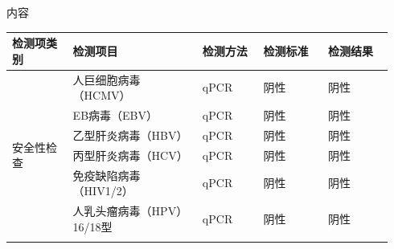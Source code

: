 \documentclass[UTF8,10pt,a4paper,fontset=fandol]{ctexart}
\newcommand{\fieldvalue}[1]{#1}
\begin{document}
\begin{center}
内容
\end{center}

\begin{tabular}{|p{0.15\linewidth}|p{0.32\linewidth}|p{0.15\linewidth}|p{0.16\linewidth}|p{0.16\linewidth}|}
\hline
检测项类别 & 检测项目 & 检测方法 & 检测标准 & 检测结果
\\ \hline
\multirow{12}{*}{安全性检查}
& %
\fieldvalue{人巨细胞病毒（HCMV）}
& %
\fieldvalue{qPCR}
& %
\fieldvalue{阴性}
& %
\fieldvalue{阴性}
\\ \cline{2-5}
& %
\fieldvalue{EB病毒（EBV）}
& %
\fieldvalue{qPCR}
& %
\fieldvalue{阴性}
& %
\fieldvalue{阴性}
\\ \cline{2-5}
& %
\fieldvalue{乙型肝炎病毒（HBV）}
& %
\fieldvalue{qPCR}
& %
\fieldvalue{阴性}
& %
\fieldvalue{阴性}
\\ \cline{2-5}
& %
\fieldvalue{丙型肝炎病毒（HCV）}
& %
\fieldvalue{qPCR}
& %
\fieldvalue{阴性}
& %
\fieldvalue{阴性}
\\ \cline{2-5}
& %
\fieldvalue{免疫缺陷病毒（HIV1/2）}
& %
\fieldvalue{qPCR}
& %
\fieldvalue{阴性}
& %
\fieldvalue{阴性}
\\ \cline{2-5}
& %
\fieldvalue{人乳头瘤病毒（HPV）16/18型}
& %
\fieldvalue{qPCR}
& %
\fieldvalue{阴性}
& %
\fieldvalue{阴性}
\\ \cline{2-5}

\end{tabular}
\end{document}
